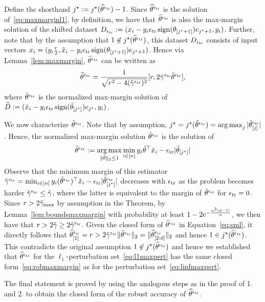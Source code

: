 Define the shorthand $j^\star := j^\star(\widehat{\theta}^{\epsilon_{\text{tr}}}) -1$. Since
$\widehat{\theta}^{\epsilon_{\text{tr}}}$ is the solution of~\eqref{eq:maxmarginl1}, by definition, we
have that $\widehat{\theta}^{\epsilon_{\text{tr}}}$ is also the max-margin solution of the shifted
dataset $D_{\epsilon_{\text{tr}}} :=(x_i - y_i \epsilon_{\text{tr}} \operatorname*{sign}(\theta_{[j^\star+1]})
e_{j^\star+1}, y_i)$.  Further, note that by the assumption that $1
\not \in j^\star(\widehat{\theta}^{\epsilon_{\text{tr}}})$, this dataset $D_{\epsilon_{\text{tr}}}$ consists of input
vectors $x_i = (y_i \frac{r}{2}, \tilde{x}_i - y_i \epsilon_{\text{tr}}
\operatorname*{sign}(\theta_{[j^\star+1]}) e_{j^\star+1} )$.  Hence via
Lemma~\ref{lem:maxmargin}, $\widehat{\theta}^{\epsilon_{\text{tr}}}$ can be written as
\begin{equation}
  \label{eq:sml}
       \widehat{\theta}^{\epsilon_{\text{tr}}} = \frac{1}{\sqrt{r^2 - 4 (\tilde{\gamma}^{\epsilon_{\text{tr}}})^2}} [r, 2 \tilde{\gamma}^{\epsilon_{\text{tr}}} \tilde{\theta}^{\epsilon_{\text{tr}}}],
\end{equation}
where $\tilde{\theta}^{\epsilon_{\text{tr}}}$ is the normalized max-margin solution
of  $\widetilde{D} := (\tilde{x}_i
- y_i \epsilon_{\text{tr}} \operatorname*{sign}({\tilde{\theta}}_{[j^\star]}) e_{j^\star},
y_i)$.

We now characterize $\tilde{\theta}^{\epsilon_{\text{tr}}}$. Note that by
assumption, $j^\star = j^\star(\tilde{\theta}^{\epsilon_{\text{tr}}}) = \operatorname*{arg\,max}_j
|{\tilde{\theta}^{\epsilon_{\text{tr}}}}_{[j]}|$. Hence, the normalized max-margin
solution $\tilde{\theta}^{\epsilon_{\text{tr}}}$ is the solution of
\begin{equation}
  \label{eq:maxmarginsmall}
  \tilde{\theta}^{\epsilon_{\text{tr}}} := \operatorname*{arg\,max}_{\|\tilde{\theta}\|_2 \leq 1}
  \min_{i\in [n]} y_i \tilde{\theta}^\top \tilde{x}_i - \epsilon_{\text{tr}}
  |{\tilde{\theta}}_{[j^\star]}| 
\end{equation}
Observe that the minimum margin of this estimator
$\tilde{\gamma}^{\epsilon_{\text{tr}}}=\min_{i\in [n]} y_i
(\tilde{\theta}^{\epsilon_{\text{tr}}})^\top \tilde{x}_i - \epsilon_{\text{tr}}
|{\tilde{\theta}^{\epsilon_{\text{tr}}}}_{[j^\star]}|$ decreases with
$\epsilon_{\text{tr}}$ as the problem becomes harder $\tilde{\gamma}^{\epsilon_{\text{tr}}}
\leq \tilde{\gamma}$, where the latter is equivalent to the margin of
$\tilde{\theta}^{\epsilon_{\text{tr}}}$ for $\epsilon_{\text{tr}} = 0$.  Since $r >
2\tilde{\gamma}_{\max}$ by assumption in the Theorem, by Lemma~\ref{lem:boundsmaxmargin}
 with probability at least $1-2\text{e}^{-\frac{\alpha^2 (d-1)}{n}}$, we then have that $r> 2\tilde{\gamma} \geq 2\tilde{\gamma}^{\epsilon_{\text{tr}}}$. Given
the closed form of $\widehat{\theta}^{\epsilon_{\text{tr}}}$ in Equation~\eqref{eq:sml}, it
directly follows that ${\widehat{\theta}^{\epsilon_{\text{tr}}}}_{[1]} = r >
2\tilde{\gamma}^{\epsilon_{\text{tr}}} \|\tilde{\theta}^{\epsilon_{\text{tr}}}\|_2 =
\|{\widehat{\theta}^{\epsilon_{\text{tr}}}}_{[2:d]}\|_2$ and hence $1\in j^\star(\widehat{\theta}^{\epsilon_{\text{tr}}})$. This
contradicts the original assumption $1\not \in j^\star(\widehat{\theta}^{\epsilon_{\text{tr}}})$ and
hence we established that $\widehat{\theta}^{\epsilon_{\text{tr}}}$ for the
$\ell_1$-perturbation set~\eqref{eq:l1maxpert} has the same closed
form~\eqref{eq:robmaxmargin} as for the perturbation
set~\eqref{eq:linfmaxpert}.

The final statement is proved by using the analogous steps as in
the proof of 1. and 2. to obtain the closed form of the robust accuracy of
$\widehat{\theta}^{\epsilon_{\text{tr}}}$.
